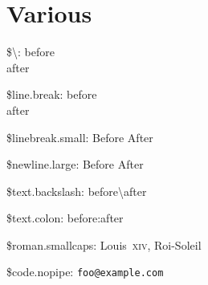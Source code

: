 \documentclass[demo]{pyscribe}
\begin{document}
\section{Various}

\par\$\textbackslash{}: before \\ after
\par\$line.break: before \\ after
\par\$linebreak.small: Before  After
\par\$newline.large: Before 
 After

\par\$text.backslash: before\textbackslash{}after
\par\$text.colon: before\string:after
\par\$roman.smallcaps: Louis~\textsc{xiv}, Roi-Soleil
\par\$code.nopipe: \verb|foo@example.com|
\end{document}
